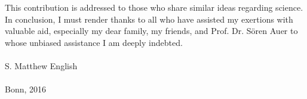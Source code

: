\noindent{}This contribution is addressed to those who share similar ideas regarding science. \\

\noindent{}In conclusion, I must render thanks to all who have assisted my exertions with valuable aid, especially my dear family, my friends, and Prof. Dr. S{\"o}ren Auer to whose unbiased assistance I am deeply indebted.\\
\vspace*{0.5cm}
\noindent{}\\S. Matthew English\\
\vspace*{0.25cm}
\noindent{}\\Bonn, 2016